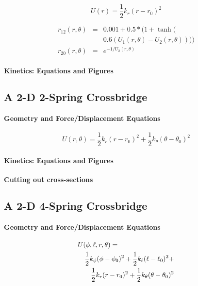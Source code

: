 \documentclass[11pt]{article}
\begin{document}
\begin{multicols}{2}
\begin{equation}
U(r)=\frac{1}{2}k_r (r-r_0)^2
\end{equation}

\begin{eqnarray}  
	r_{12}(r, \theta) & = & 0.001 + 0.5 * (1 + \tanh( \nonumber \\
				&   & 0.6 (U_1(r, \theta) - U_2(r, \theta)))) \\
	r_{20}(r, \theta) & = & e^{-1 / U_2(r, \theta)}
\end{eqnarray} 
 
\paragraph*{Kinetics: Equations and Figures}

\subsection*{A 2-D 2-Spring Crossbridge}

\paragraph*{Geometry and Force/Displacement Equations}

\begin{equation}
U(r,\theta)=\frac{1}{2}k_r (r-r_0)^2+\frac{1}{2}k_\theta (\theta-\theta_0)^2
\end{equation}

\paragraph*{Kinetics: Equations and Figures}

\paragraph*{Cutting out cross-sections}

\subsection*{A 2-D 4-Spring Crossbridge}
\paragraph*{Geometry and Force/Displacement Equations}
\begin{eqnarray}
	\lefteqn{U(\phi,\ell,r,\theta) = }  \nonumber \\
 	& & \frac{1}{2}k_\phi (\phi-\phi_0)^2 + \frac{1}{2}k_\ell (\ell-\ell_0)^2 + \nonumber \\
	& & \frac{1}{2}k_r (r-r_0)^2 + \frac{1}{2}k_\theta (\theta-\theta_0)^2
\end{eqnarray}


\end{multicols}
\end{document}
